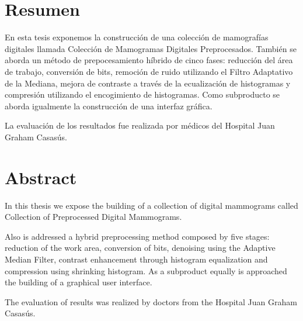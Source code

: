 \newpage 
{}
\chapter*{Resumen}

En esta tesis exponemos la construcción de una colección de mamografías
digitales llamada Colección de Mamogramas Digitales Preprocesados. También se
aborda un método de prepocesamiento híbrido de cinco fases: reducción del área
de trabajo, conversión de bits, remoción de ruido utilizando el Filtro
Adaptativo de la Mediana, mejora de contraste a través de la ecualización de
histogramas y compresión utilizando el encogimiento de histogramas. Como
subproducto se aborda igualmente la construcción de una interfaz gráfica.

La evaluación de los resultados fue realizada por médicos del Hospital Juan
Graham Casasús. 


\chapter*{Abstract}

In this thesis we expose the building of a collection of digital mammograms called
Collection of Preprocessed Digital Mammograms.

Also is addressed a hybrid preprocessing method composed by five stages:
reduction of the work area, conversion of bits, denoising using the Adaptive
Median Filter, contrast enhancement through histogram equalization and
compression using shrinking histogram. As a subproduct equally is approached
the building of a graphical user interface.

The evaluation of results was realized by doctors from the Hospital Juan Graham
Casasús.
